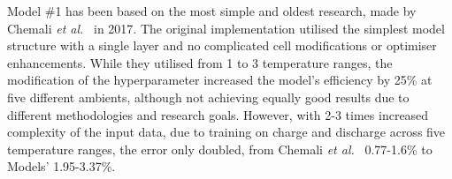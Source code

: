 
%
%
Model \#1 has been based on the most simple and oldest research, made by Chemali \textit{et al.}~\cite{Chemali2017} in 2017.
The original implementation utilised the simplest model structure with a single layer and no complicated cell modifications or optimiser enhancements.
While they utilised from 1 to 3 temperature ranges, the modification of the hyperparameter increased the model's efficiency by 25\% at five different ambients, although not achieving equally good results due to different methodologies and research goals.
However, with 2-3 times increased complexity of the input data, due to training on charge and discharge across five temperature ranges, the error only doubled, from Chemali \textit{et al.}~\cite{Chemali2017} 0.77-1.6\% to Models' 1.95-3.37\%.

